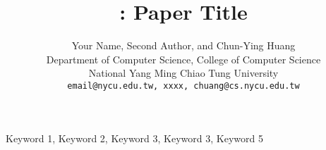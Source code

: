 \documentclass[lettersize,journal]{IEEEtran}
\begin{document}
\title{\sys: Paper Title}
\author{
	Your Name, Second Author, and Chun-Ying Huang\\
	Department of Computer Science, College of Computer Science\\
       	National Yang Ming Chiao Tung University\\
    \texttt{email@nycu.edu.tw, xxxx, chuang@cs.nycu.edu.tw}
}

\maketitle

\begin{abstract}

\end{abstract}

\begin{IEEEkeywords}
Keyword 1, Keyword 2, Keyword 3, Keyword 3, Keyword 5
\end{IEEEkeywords}





\end{document}
